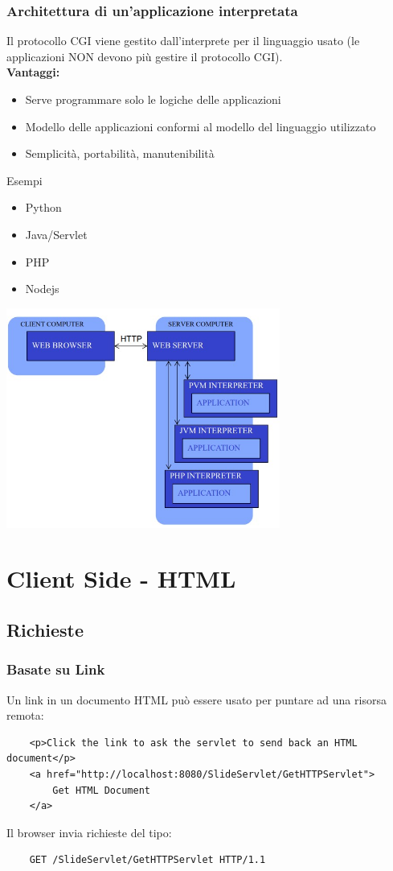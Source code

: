 \subsubsection{Architettura di un'applicazione interpretata}
Il protocollo CGI viene gestito dall'interprete per il linguaggio usato (le applicazioni NON devono più gestire il protocollo CGI).
\\\textbf{Vantaggi:}
\begin{itemize}
    \item Serve programmare solo le logiche delle applicazioni
    \item Modello delle applicazioni conformi al modello del linguaggio utilizzato
    \item Semplicità, portabilità, manutenibilità
\end{itemize}
Esempi
\begin{itemize}
    \item Python
    \item Java/Servlet
    \item PHP
    \item Nodejs
\end{itemize}
\begin{center}
    \includegraphics[width=0.675\textwidth]{img/appWeb4.jpg}
\end{center}

\section{Client Side - HTML}
\subsection{Richieste}
\subsubsection{Basate su Link}
Un link in un documento HTML può essere usato per puntare ad una risorsa remota:
\begin{verbatim}
    <p>Click the link to ask the servlet to send back an HTML document</p>
    <a href="http://localhost:8080/SlideServlet/GetHTTPServlet">
        Get HTML Document
    </a>
\end{verbatim}
Il browser invia richieste del tipo:
\begin{verbatim}
    GET /SlideServlet/GetHTTPServlet HTTP/1.1
\end{verbatim}

